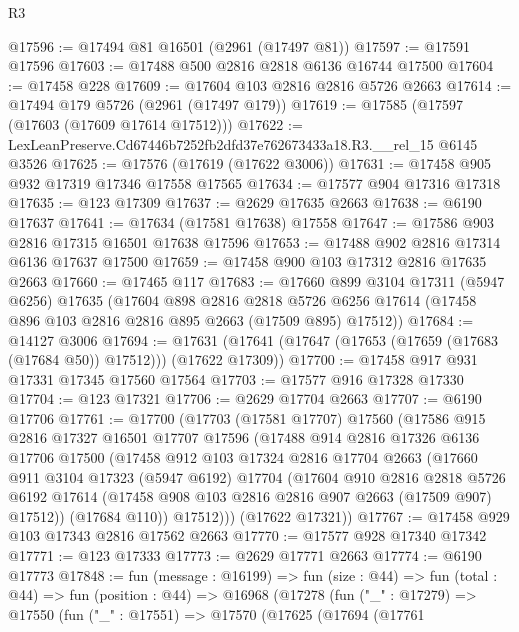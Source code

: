 \begin{lexlean}{R3}
\begin{coremodule}
@17596 := @17494 @81 @16501 (@2961 (@17497 @81))
@17597 := @17591 @17596
@17603 := @17488 @500 @2816 @2818 @6136 @16744 @17500
@17604 := @17458 @228
@17609 := @17604 @103 @2816 @2816 @5726 @2663
@17614 := @17494 @179 @5726 (@2961 (@17497 @179))
@17619 := @17585 (@17597 (@17603 (@17609 @17614 @17512)))
@17622 := LexLeanPreserve.Cd67446b7252fb2dfd37e762673433a18.R3.__rel_15 @6145 @3526
@17625 := @17576 (@17619 (@17622 @3006))
@17631 := @17458 @905 @932 @17319 @17346 @17558 @17565
@17634 := @17577 @904 @17316 @17318
@17635 := @123 @17309
@17637 := @2629 @17635 @2663
@17638 := @6190 @17637
@17641 := @17634 (@17581 @17638) @17558
@17647 := @17586 @903 @2816 @17315 @16501 @17638 @17596
@17653 := @17488 @902 @2816 @17314 @6136 @17637 @17500
@17659 := @17458 @900 @103 @17312 @2816 @17635 @2663
@17660 := @17465 @117
@17683 := @17660
    @899
    @3104
    @17311
    (@5947 @6256)
    @17635
    (@17604
      @898
      @2816
      @2818
      @5726
      @6256
      @17614
      (@17458 @896 @103 @2816 @2816 @895 @2663 (@17509 @895) @17512))
@17684 := @14127 @3006
@17694 := @17631 (@17641 (@17647 (@17653 (@17659 (@17683 (@17684 @50)) @17512))) (@17622 @17309))
@17700 := @17458 @917 @931 @17331 @17345 @17560 @17564
@17703 := @17577 @916 @17328 @17330
@17704 := @123 @17321
@17706 := @2629 @17704 @2663
@17707 := @6190 @17706
@17761 := @17700
    (@17703
      (@17581 @17707)
      @17560
      (@17586
        @915
        @2816
        @17327
        @16501
        @17707
        @17596
        (@17488
          @914
          @2816
          @17326
          @6136
          @17706
          @17500
          (@17458
            @912
            @103
            @17324
            @2816
            @17704
            @2663
            (@17660
              @911
              @3104
              @17323
              (@5947 @6192)
              @17704
              (@17604
                @910
                @2816
                @2818
                @5726
                @6192
                @17614
                (@17458 @908 @103 @2816 @2816 @907 @2663 (@17509 @907) @17512))
              (@17684 @110))
            @17512)))
      (@17622 @17321))
@17767 := @17458 @929 @103 @17343 @2816 @17562 @2663
@17770 := @17577 @928 @17340 @17342
@17771 := @123 @17333
@17773 := @2629 @17771 @2663
@17774 := @6190 @17773
@17848 := fun (message : @16199) =>
  fun (size : @44) =>
  fun (total : @44) =>
  fun (position : @44) =>
  @16968
    (@17278
      (fun ("_" : @17279) =>
      @17550
        (fun ("_" : @17551) =>
        @17570
          (@17625
            (@17694
              (@17761

\end{coremodule}
\end{lexlean}
